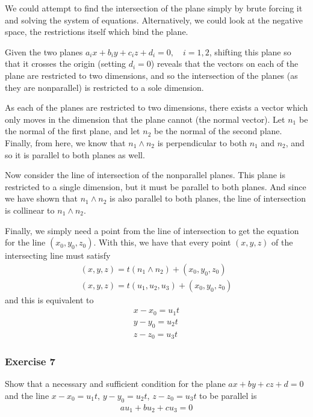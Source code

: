 \documentclass{article}
\begin{document}
	We could attempt to find the intersection of the plane simply by brute forcing it and solving the system of equations. Alternatively, we could look at the negative space, the restrictions itself which bind the plane.

	Given the two planes $a_ix + b_iy + c_iz + d_i = 0, \quad i = 1, 2$, shifting this plane so that it crosses the origin (setting $d_i = 0$) reveals that the vectors on each of the plane are restricted to two dimensions, and so the intersection of the planes (as they are nonparallel) is restricted to a sole dimension.
	
	As each of the planes are restricted to two dimensions, there exists a vector which only moves in the dimension that the plane cannot (the normal vector). Let $n_1$ be the normal of the first plane, and let $n_2$ be the normal of the second plane. Finally, from here, we know that $n_1 \wedge n_2$ is perpendicular to both $n_1$ and $n_2$, and so it is parallel to both planes as well.
	
	Now consider the line of intersection of the nonparallel planes. This plane is restricted to a single dimension, but it must be parallel to both planes. And since we have shown that $n_1 \wedge n_2$ is also parallel to both planes, the line of intersection is collinear to $n_1 \wedge n_2$.
	
	Finally, we simply need a point from the line of intersection to get the equation for the line $(x_0, y_0, z_0)$. With this, we have that every point $(x, y, z)$ of the intersecting line must satisfy
	\begin{gather*}
		(x, y, z) = t (n_1 \wedge n_2) + (x_0, y_0, z_0) \\
		(x, y, z) = t (u_1, u_2, u_3) + (x_0, y_0, z_0)
	\end{gather*}
	and this is equivalent to
	\begin{gather*}
		x - x_0 = u_1t \\
		y - y_0 = u_2t \\
		z - z_0 = u_3t
	\end{gather*}
	
	\subsubsection*{Exercise 7}
	Show that a necessary and sufficient condition for the plane $ax + by + cz + d = 0$ and the line $x - x_0 = u_1t$, $y - y_0 = u_2t$, $z - z_0 = u_3t$ to be parallel is
	\begin{gather*}
		au_1 + bu_2 + cu_3 = 0
	\end{gather*}
	
\end{document}
